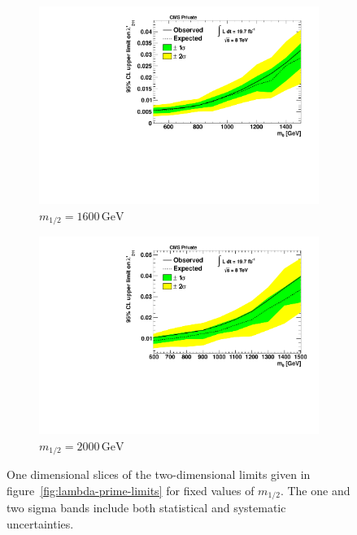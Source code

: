\begin{figure}[!p]
  \begin{subfigure}[b]{0.495\textwidth}
    \centering
    \includegraphics[width=\textwidth]{plots/limit_m12_1600.pdf}
    \setlength{\abovecaptionskip}{-20pt}
    \setlength{\belowcaptionskip}{10pt}
    \caption{$m_{1/2} = 1600\,\text{GeV}$\label{fig:limit-m12-1600}}
  \end{subfigure}
  \begin{subfigure}[b]{0.495\textwidth}
    \centering
    \includegraphics[width=\textwidth]{plots/limit_m12_2000.pdf}
    \setlength{\abovecaptionskip}{-20pt}
    \setlength{\belowcaptionskip}{10pt}
    \caption{$m_{1/2} = 2000\,\text{GeV}$\label{fig:limit-m12-2000}}
  \end{subfigure}

  \caption{One dimensional slices of the two-dimensional limits given in figure~\ref{fig:lambda-prime-limits} for fixed values of $m_{1/2}$. The one and two sigma bands include both statistical and systematic uncertainties.}
  \label{fig:1d-limits}
\end{figure}

